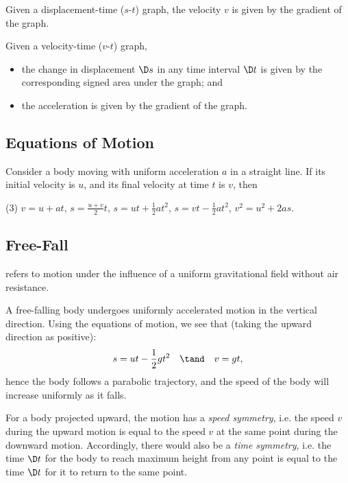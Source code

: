 Given a displacement-time ($s$-$t$) graph, the velocity $v$ is given by the gradient of the graph.

Given a velocity-time ($v$-$t$) graph,
\begin{itemize}
    \item the change in displacement $\D s$ in any time interval $\D t$ is given by the corresponding signed area under the graph; and
    \item the acceleration is given by the gradient of the graph.
\end{itemize}

\subsection{Equations of Motion}

\begin{theorem}
    Consider a body moving with uniform acceleration $a$ in a straight line. If its initial velocity is $u$, and its final velocity at time $t$ is $v$, then
    \begin{tasks}(3)
        \task $v = u + at$,
        \task $\displaystyle s = \frac{u+v}{2} t$,
        \task $\displaystyle s = ut + \frac12 at^2$,
        \task $\displaystyle s = vt - \frac12 at^2$,
        \task $v^2 = u^2 + 2as$.
    \end{tasks}
\end{theorem}

\subsection{Free-Fall}

\begin{definition}
     refers to motion under the influence of a uniform gravitational field without air resistance.
\end{definition}

A free-falling body undergoes uniformly accelerated motion in the vertical direction. Using the equations of motion, we see that (taking the upward direction as positive): \[s = ut - \frac12 gt^2 \quad \tand \quad v = gt,\] hence the body follows a parabolic trajectory, and the speed of the body will increase uniformly as it falls.

For a body projected upward, the motion has a \emph{speed symmetry}, i.e. the speed $v$ during the upward motion is equal to the speed $v$ at the same point during the downward motion. Accordingly, there would also be a \emph{time symmetry}, i.e. the time $\D t$ for the body to reach maximum height from any point is equal to the time $\D t$ for it to return to the same point.


